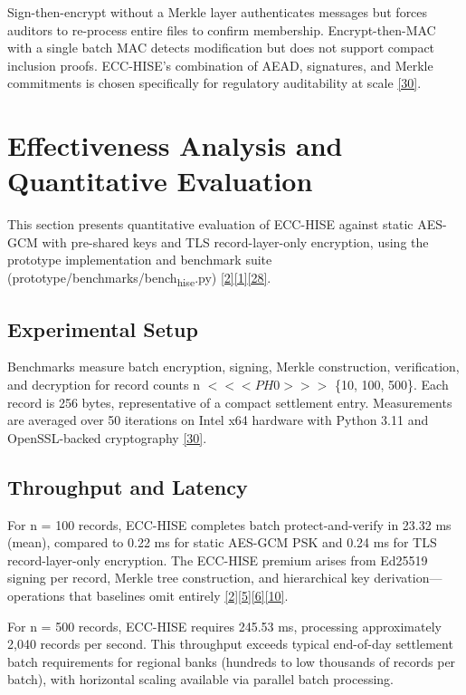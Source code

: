 \indent Sign-then-encrypt without a Merkle layer authenticates messages but forces auditors to re-process entire files to confirm membership. Encrypt-then-MAC with a single batch MAC detects modification but does not support compact inclusion proofs. ECC-HISE's combination of AEAD, signatures, and Merkle commitments is chosen specifically for regulatory auditability at scale \hyperref[ref:30]{[30]}.

\section{Effectiveness Analysis and Quantitative Evaluation}

\indent This section presents quantitative evaluation of ECC-HISE against static AES-GCM with pre-shared keys and TLS record-layer-only encryption, using the prototype implementation and benchmark suite (prototype/benchmarks/bench\textsubscript{hise}.py) \hyperref[ref:2]{[2]}\hyperref[ref:1]{[1]}\hyperref[ref:28]{[28]}.

\subsection{Experimental Setup}

\indent Benchmarks measure batch encryption, signing, Merkle construction, verification, and decryption for record counts n $<<<PH0>>>$ \{10, 100, 500\}. Each record is 256 bytes, representative of a compact settlement entry. Measurements are averaged over 50 iterations on Intel x64 hardware with Python 3.11 and OpenSSL-backed cryptography \hyperref[ref:30]{[30]}.

\subsection{Throughput and Latency}

\indent For n = 100 records, ECC-HISE completes batch protect-and-verify in 23.32 ms (mean), compared to 0.22 ms for static AES-GCM PSK and 0.24 ms for TLS record-layer-only encryption. The ECC-HISE premium arises from Ed25519 signing per record, Merkle tree construction, and hierarchical key derivation---operations that baselines omit entirely \hyperref[ref:2]{[2]}\hyperref[ref:5]{[5]}\hyperref[ref:6]{[6]}\hyperref[ref:10]{[10]}.

\indent For n = 500 records, ECC-HISE requires 245.53 ms, processing approximately 2,040 records per second. This throughput exceeds typical end-of-day settlement batch requirements for regional banks (hundreds to low thousands of records per batch), with horizontal scaling available via parallel batch processing.


